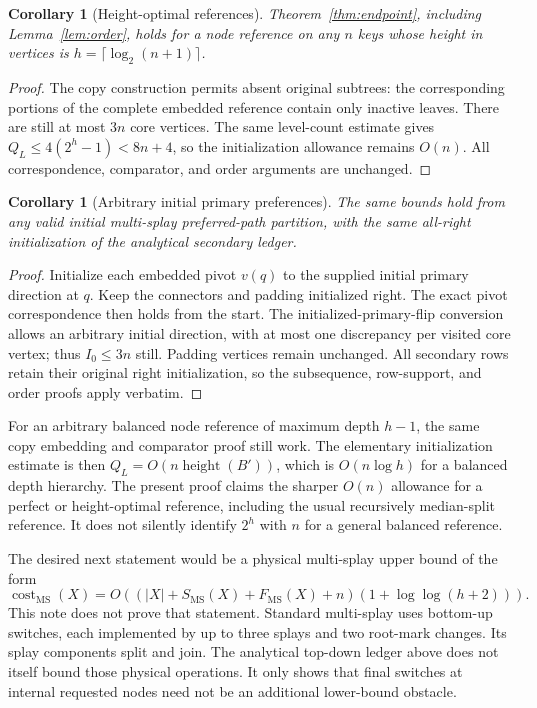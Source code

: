 \documentclass[11pt]{article}
\newtheorem{corollary}[theorem]{Corollary}
\newcommand{\MS}{\mathrm{MS}}
\begin{document}
\begin{corollary}[Height-optimal references]
Theorem~\ref{thm:endpoint}, including Lemma~\ref{lem:order}, holds for a
node reference on any $n$ keys whose height in vertices is
$h=\lceil\log_2(n+1)\rceil$.
\end{corollary}
\begin{proof}
The copy construction permits absent original subtrees: the
corresponding portions of the complete embedded reference contain only
inactive leaves. There are still at most $3n$ core vertices. The same
level-count estimate gives
$Q_L\le4(2^h-1)<8n+4$, so the initialization allowance remains $O(n)$.
All correspondence, comparator, and order arguments are unchanged.
\end{proof}

\begin{corollary}[Arbitrary initial primary preferences]
The same bounds hold from any valid initial multi-splay preferred-path
partition, with the same all-right initialization of the analytical
secondary ledger.
\end{corollary}
\begin{proof}
Initialize each embedded pivot $v(q)$ to the supplied initial primary
direction at $q$. Keep the connectors and padding initialized right.
The exact pivot correspondence then holds from the start. The
initialized-primary-flip conversion allows an arbitrary initial
direction, with at most one discrepancy per visited core vertex;
thus $I_0\le3n$ still. Padding vertices remain unchanged. All secondary
rows retain their original right initialization, so the subsequence,
row-support, and order proofs apply verbatim.
\end{proof}

For an arbitrary balanced node reference of maximum depth $h-1$, the
same copy embedding and comparator proof still work. The elementary
initialization estimate is then $Q_L=O(n\operatorname{height}(B'))$,
which is $O(n\log h)$ for a balanced depth hierarchy. The present proof
claims the sharper $O(n)$ allowance for a perfect or height-optimal
reference, including the usual recursively median-split reference.
It does not
silently identify $2^h$ with $n$ for a general balanced reference.

The desired next statement would be a physical multi-splay upper bound
of the form
\[
 \operatorname{cost}_{\MS}(X)
 =O\!\left((|X|+S_{\MS}(X)+F_{\MS}(X)+n)
       (1+\log\log(h+2))\right).
\]
This note does not prove that statement. Standard multi-splay uses
bottom-up switches, each implemented by up to three splays and two
root-mark changes. Its splay components split and join. The analytical
top-down ledger above does not itself bound those physical operations.
It only shows that final switches at internal requested nodes need not
be an additional lower-bound obstacle.
\end{document}

